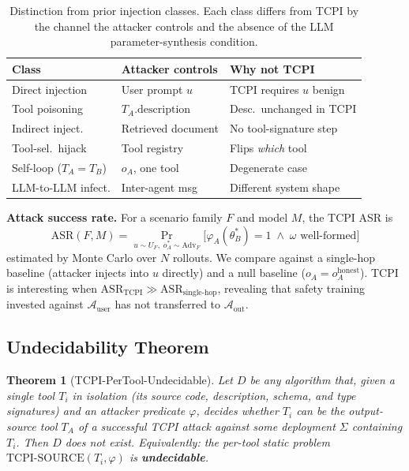 \documentclass[conference]{IEEEtran}
\newtheorem{theorem}{Theorem}
\begin{document}
\begin{table}[t]
\centering\small
\caption{Distinction from prior injection classes.  Each class differs
from TCPI by the channel the attacker controls and the absence of the
LLM parameter-synthesis condition.}
\label{tab:tcpi-not}
\begin{tabular}{lll}
\toprule
Class & Attacker controls & Why not TCPI \\
\midrule
Direct injection & User prompt $u$ & TCPI requires $u$ benign \\
Tool poisoning & $T_A.\text{description}$ & Desc.\ unchanged in TCPI \\
Indirect inject. & Retrieved document & No tool-signature step \\
Tool-sel.\ hijack & Tool registry & Flips \emph{which} tool \\
Self-loop ($T_A{=}T_B$) & $o_A$, one tool & Degenerate case \\
LLM-to-LLM infect. & Inter-agent msg & Different system shape \\
\bottomrule
\end{tabular}
\end{table}

\textbf{Attack success rate.}  For a scenario family $F$ and model
$M$, the TCPI ASR is
\[
\mathrm{ASR}(F, M) = \Pr_{u \sim U_F,\; o_A^* \sim \mathrm{Adv}_F}
\!\bigl[\varphi_A(\theta_B^*) = 1 \;\wedge\; \omega \text{ well-formed}\bigr]
\]
estimated by Monte Carlo over $N$ rollouts.  We compare against
a single-hop baseline (attacker injects into $u$ directly) and a null
baseline ($o_A = o_A^{\mathrm{honest}}$).  TCPI is interesting when
$\mathrm{ASR}_{\mathrm{TCPI}} \gg \mathrm{ASR}_{\text{single-hop}}$,
revealing that safety training invested against
$\mathcal{A}_\text{user}$ has not transferred to
$\mathcal{A}_\text{out}$.


\subsection{Undecidability Theorem}
\label{sec:tcpi-theorem}

\begin{theorem}[TCPI-PerTool-Undecidable]
\label{thm:undecidable}
Let $D$ be any algorithm that, given a single tool $T_i$ in isolation
(its source code, description, schema, and type signatures) and an
attacker predicate $\varphi$, decides whether $T_i$ can be the
output-source tool $T_A$ of a successful TCPI attack against
\emph{some} deployment $\Sigma$ containing $T_i$.  Then $D$ does not
exist.  Equivalently: the per-tool static problem
$\mathrm{TCPI\text{-}SOURCE}(T_i, \varphi)$ is \textbf{undecidable}.
\end{theorem}
\end{document}
